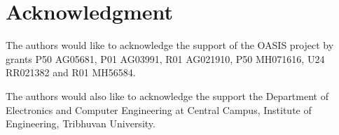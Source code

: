 \documentclass[journal,twoside]{IEEEtran}
\begin{document}



\section*{Acknowledgment}
The authors would like to acknowledge the support of the OASIS project by grants P50 AG05681, P01 AG03991, R01 AG021910, P50 MH071616, U24 RR021382 and R01 MH56584.
\par The authors would also like to acknowledge the support the Department of Electronics and Computer Engineering at Central Campus, Institute of Engineering, Tribhuvan University.



\ifCLASSOPTIONcaptionsoff
  \newpage
\fi



\end{document}
